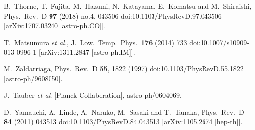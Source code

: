 \documentclass[tightenlines,floats,aps,nofootinbib,prd,onecolumn,preprintnumbers]{revtex4}
\begin{document}
\begin{thebibliography}{5}
  B.~Thorne, T.~Fujita, M.~Hazumi, N.~Katayama, E.~Komatsu and M.~Shiraishi,
      Phys.\ Rev.\ D {\bf 97} (2018) no.4,  043506
        doi:10.1103/PhysRevD.97.043506
	  [arXiv:1707.03240 [astro-ph.CO]].

  T.~Matsumura {\it et al.},
  J.\ Low.\ Temp.\ Phys.\  {\bf 176} (2014) 733
  doi:10.1007/s10909-013-0996-1
  [arXiv:1311.2847 [astro-ph.IM]].

  M.~Zaldarriaga,
  Phys.\ Rev.\ D {\bf 55}, 1822 (1997)
  doi:10.1103/PhysRevD.55.1822
  [astro-ph/9608050].
	
  J.~Tauber {\it et al.} [Planck Collaboration],
  astro-ph/0604069.

  D.~Yamauchi, A.~Linde, A.~Naruko, M.~Sasaki and T.~Tanaka,
  Phys.\ Rev.\ D {\bf 84} (2011) 043513
  doi:10.1103/PhysRevD.84.043513
  [arXiv:1105.2674 [hep-th]].

\end{thebibliography}
\end{document}
